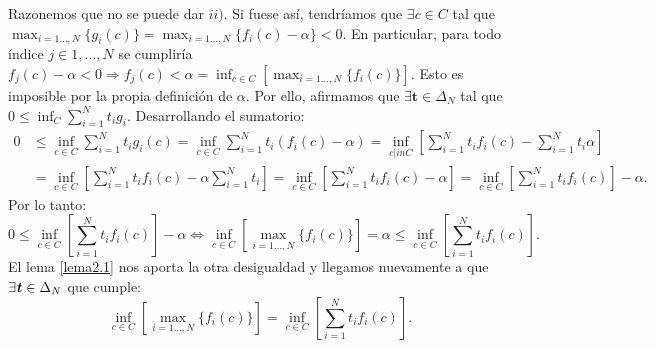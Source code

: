 	Razonemos que no se puede dar $ ii) $. Si fuese así, tendríamos que $ \exists c \in C $ tal que $ \max_{i=1\dots,N } \{g_i(c)\} =  \max_{i=1\dots,N } \{f_i(c) - \alpha \} < 0 $. En particular, para todo índice $ j \in {1,...,N} $ se cumpliría $ f_j(c) - \alpha < 0 \Longrightarrow f_j(c) < \alpha = \inf_{ c\in C}\left[\max_{i=1\dots,N } \{f_i(c)\} \right] $. Esto es imposible por la propia definición de $ \alpha $. Por ello, afirmamos que $ \exists \mathbf{t} \in \Delta_N $ tal que $ 0 \leq \inf_{C}  \sum_{i=1}^{N}{t_i g_i}$. Desarrollando el sumatorio:
	\begin{equation*}
	\begin{split}
	0 &\leq \inf_{c \in C}  \sum_{i=1}^{N}{t_i g_i (c)} = \inf_{c \in C}  \sum_{i=1}^{N}{t_i(f_i(c) - \alpha)} = \inf_{c |in C} \left[ \sum_{i=1}^{N}{t_i f_i(c)} - \sum_{i=1}^{N}{t_i\alpha} \right]\\
	&= \inf_{c \in C} \left[ \sum_{i=1}^{N}{t_i f_i(c)} -\alpha \sum_{i=1}^{N}{t_i} \right] = \inf_{c \in C} \left[ \sum_{i=1}^{N}{t_i f_i(c)} - \alpha \right] = \inf_{c \in C} \left[ \sum_{i=1}^{N}{t_i f_i(c)}\right] - \alpha.
	\end{split}
	\end{equation*}
	Por lo tanto:
	\[
	0 \leq \inf_{c \in C} \left[ \sum_{i=1}^{N}{t_i f_i(c)}\right] - \alpha \Longleftrightarrow \inf_{c \in C}\left[ \max_{i=1\dots,N } \{f_i(c)\}\right] = \alpha  \leq \inf_{c \in C} \left[ \sum_{i=1}^{N}{t_i f_i(c)}\right].
	\]
	El lema \ref{lema2.1} nos aporta la otra desigualdad y llegamos nuevamente a que $ \exists \textbf{\emph{t}} \in \Delta_N $ que cumple:
	\[
	\inf_{c \in C}\left[ \max_{i=1\dots,N } \{f_i(c)\}\right] = \inf_{c \in C} \left[ \sum_{i=1}^{N}{t_i f_i(c)}\right]. \]
	